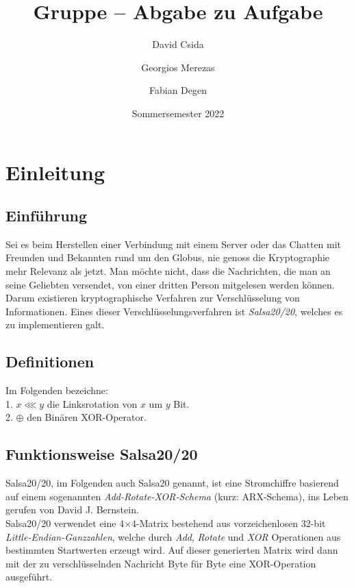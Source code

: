 \documentclass[course=erap]{aspdoc}
\author{David Csida \and Georgios Merezas \and Fabian Degen}
\date{Sommersemester 2022} %
\title{Gruppe \theGroup{} -- Abgabe zu Aufgabe \theNumber}
\begin{document}
\maketitle

\section{Einleitung}
\subsection{Einführung}
Sei es beim Herstellen einer Verbindung mit einem Server oder das Chatten mit Freunden und Bekannten rund um
den Globus, nie genoss die Kryptographie mehr Relevanz als jetzt. Man möchte nicht, dass die Nachrichten,
die man an seine Geliebten versendet, von einer dritten Person mitgelesen werden können. Darum existieren
kryptographische Verfahren zur Verschlüsselung von Informationen. Eines dieser Ver\-schlüsselungs\-ver\-fahren ist
\emph{Salsa20/20}, welches es zu implementieren galt.

\subsection{Definitionen}
Im Folgenden bezeichne: 
\\ \hspace*{5mm} 1. $x \lll y$ die Linksrotation von $x$ um $y$ Bit. 
\\ \hspace*{5mm} 2. $\oplus$ den Binären XOR-Operator.

\subsection{Funktionsweise Salsa20/20}
Salsa20/20, im Folgenden auch Salsa20 genannt, ist eine Stromchiffre basierend auf einem sogenannten 
\emph{Add-Rotate-XOR-Schema} (kurz: ARX-Schema), ins Leben gerufen von David J. Bernstein.\\
Salsa20/20 verwendet eine 4$\times$4-Matrix bestehend aus vorzeichenlosen 32-bit \emph{Little-Endian-Ganzzahlen},
welche durch \emph{Add}, \emph{Rotate} und \emph{XOR} Operationen aus bestimmten Startwerten erzeugt wird.
Auf dieser generierten Matrix wird dann mit der zu ver\-schlü\-ssel\-nden Nachricht Byte für 
Byte eine XOR-Operation ausgeführt.
\end{document}

